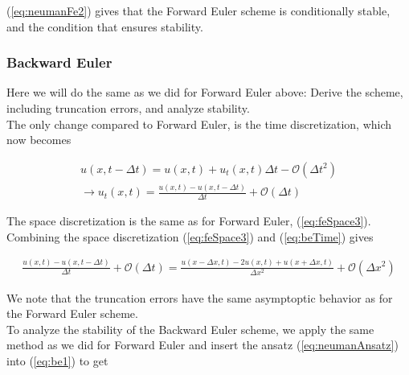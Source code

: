 \documentclass{article}
\begin{document}
(\ref{eq:neumanFe2}) gives that the Forward Euler scheme is conditionally stable, and the condition that ensures stability.


\subsubsection{Backward Euler}
Here we will do the same as we did for Forward Euler above: Derive the scheme, including truncation errors, and analyze stability.\\

The only change compared to Forward Euler, is the time discretization, which now becomes

\begin{subequations}
	\begin{align}
	u(x, t- \Delta t)  = u(x,t) +  u_t(x,t) \Delta t - \mathcal{O}(\Delta t^2)\\
	\rightarrow u_t(x,t) = \frac{u(x, t) - u(x,t - \Delta t)}{\Delta t} + \mathcal{O}(\Delta t)\label{eq:beTime}
	\end{align}
\end{subequations}

The space discretization is the same as for Forward Euler, (\ref{eq:feSpace3}). Combining the space discretization (\ref{eq:feSpace3}) and (\ref{eq:beTime}) gives

\begin{subequations}
	\begin{align}
		\frac{u(x, t) - u(x,t - \Delta t)}{\Delta t} + \mathcal{O}(\Delta t) = \frac{u(x - \Delta x, t) - 2u(x,t) + u(x+ \Delta x, t)}{\Delta x^2} + \mathcal{O}(\Delta x^2)\label{eq:be1}
	\end{align}
\end{subequations}

We note that the truncation errors have the same asymptoptic behavior as for the Forward Euler scheme. \\

To analyze the stability of the Backward Euler scheme, we apply the same method as we did for Forward Euler and insert the ansatz (\ref{eq:neumanAnsatz}) into (\ref{eq:be1}) to get
\end{document}
